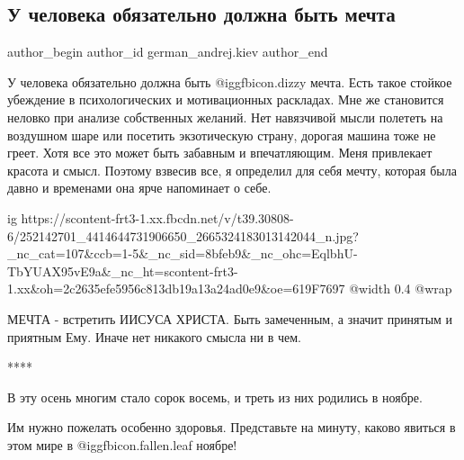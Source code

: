  
 
 
 
 
 
\subsection{У человека обязательно должна быть мечта}
\label{sec:03_11_2021.fb.german_andrej.kiev.1.mechta}
 
\ifcmt
 author_begin
   author_id german_andrej.kiev
 author_end
\fi

У человека обязательно должна быть  @igg{fbicon.dizzy}  мечта. Есть такое стойкое убеждение в
психологических и мотивационных раскладах. Мне же становится неловко при
анализе собственных желаний. Нет навязчивой мысли полететь на воздушном шаре
или посетить экзотическую страну, дорогая машина тоже не греет. Хотя все это
может быть забавным и впечатляющим. Меня привлекает красота и смысл. Поэтому
взвесив все, я определил для себя мечту, которая была давно и временами она
ярче напоминает о себе.

\ifcmt
  ig https://scontent-frt3-1.xx.fbcdn.net/v/t39.30808-6/252142701_4414644731906650_2665324183013142044_n.jpg?_nc_cat=107&ccb=1-5&_nc_sid=8bfeb9&_nc_ohc=EqlbhU-TbYUAX95vE9a&_nc_ht=scontent-frt3-1.xx&oh=2c2635efe5956c813db19a13a24ad0e9&oe=619F7697
  @width 0.4
  @wrap 
\fi

МЕЧТА - встретить ИИСУСА ХРИСТА. Быть замеченным, а значит принятым и приятным
Ему. Иначе нет никакого смысла ни в чем.

****

В эту осень многим стало сорок восемь, и треть из них родились в ноябре. 

Им нужно пожелать особенно здоровья. Представьте на минуту, каково явиться в
этом мире в  @igg{fbicon.fallen.leaf}  ноябре!

